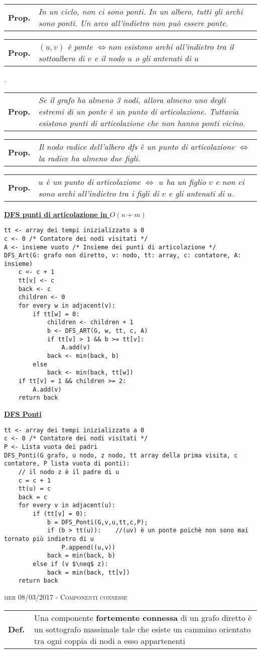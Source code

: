 \documentclass[a4paper,10pt]{article} %
\newcommand{\malgorithm}[1]{%
    {\bigbreak \par \hspace*{4pt} \underline{\textbf {#1}}}}
\newcommand{\msection}[1]{%
    {\newpage\bigbreak \bigbreak \par \hfil \huge \textsc {#1}}\par}
\renewcommand{\b}[1]{%
    {\textbf{#1}}}
\newcommand{\mdef}[1]{%
    {\smallbreak\par\begin{tabular}{ll} \textbf{Def.$\;\;$} & \begin{minipage}[t]{0.80\columnwidth}\normalsize  {#1}\end{minipage}\tabularnewline \end{tabular}}\smallskip\par}
\newcommand{\mprop}[1]{%
    {\smallbreak\par\begin{tabular}{ll} \textbf{Prop.} & \begin{minipage}[t]{0.8\columnwidth}\emph  {#1}\end{minipage}\tabularnewline \end{tabular}}\smallskip\par}
\begin{document}
\mprop{In un ciclo, non ci sono ponti. In un albero, tutti gli archi sono ponti.  Un arco all'indietro non può essere ponte.}
\mprop{$(u,v)$ è ponte \quad$\Leftrightarrow$\quad non esistono archi all'indietro tra il sottoalbero di $v$ e il nodo $u$ o gli antenati di $u$}.
\mprop{Se il grafo ha almeno 3 nodi, allora almeno uno degli estremi di un ponte è un punto di articolazione. Tuttavia esistono punti di articolazione che non hanno ponti vicino.}

\mprop{Il nodo radice dell'albero dfs è un punto di articolazione $\Leftrightarrow$ la radice ha almeno due figli.}
\mprop{$u$ è un punto di articolazione $\Leftrightarrow$ $u$ ha un figlio $v$ e non ci sono archi all'indietro tra i figli di $v$ e gli antenati di $u$.}
\malgorithm{DFS punti di articolazione in $O(n+m)$}
\begin{lstlisting}
tt <- array dei tempi inizializzato a 0
c <- 0 /* Contatore dei nodi visitati */
A <- insieme vuoto /* Insieme dei punti di articolazione */
DFS_Art(G: grafo non diretto, v: nodo, tt: array, c: contatore, A: insieme)
    c <- c + 1
    tt[v] <- c
    back <- c
    children <- 0
    for every w in adjacent(v):
        if tt[w] = 0:
            children <- children + 1
            b <- DFS_ART(G, w, tt, c, A)
            if tt[v] > 1 && b >= tt[v]:
                A.add(v)
            back <- min(back, b)
        else
            back <- min(back, tt[w])
    if tt[v] = 1 && children >= 2:
        A.add(v)
    return back
\end{lstlisting}

\malgorithm{DFS Ponti}
\begin{lstlisting}
tt <- array dei tempi inizializzato a 0
c <- 0 /* Contatore dei nodi visitati */
P <- Lista vuota dei padri
DFS_Ponti(G grafo, u nodo, z nodo, tt array della prima visita, c contatore, P lista vuota di ponti):
    // il nodo z è il padre di u
    c = c + 1
    tt(u) = c
    back = c
    for every v in adjacent(u): 
        if (tt[v] = 0):
            b = DFS_Ponti(G,v,u,tt,c,P); 
            if (b > tt(u)):    //(uv) è un ponte poichè non sono mai tornato più indietro di u
                P.append((u,v))
            back = min(back, b)
        else if (v $\neq$ z):
            back = min(back, tt[v])
    return back
\end{lstlisting}



\msection{mer 08/03/2017  - Componenti connesse}




\mdef{Una componente \b{fortemente connessa} di un grafo diretto è un sottografo massimale tale che esiste un cammino orientato tra ogni coppia di nodi a esso appartenenti}
\end{document}
